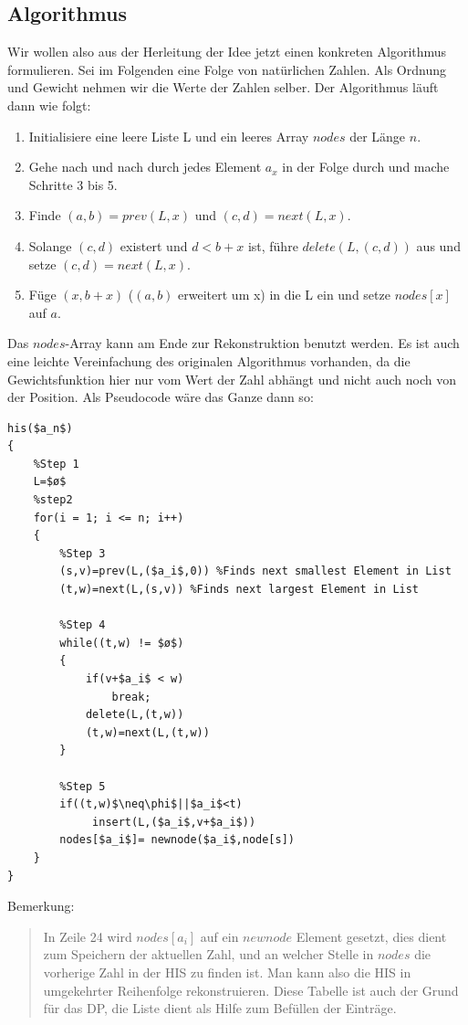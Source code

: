 \subsection{Algorithmus}
 
Wir wollen also aus der Herleitung der Idee jetzt einen konkreten Algorithmus formulieren. Sei im Folgenden \an eine Folge von natürlichen Zahlen. Als Ordnung und Gewicht nehmen wir die Werte der Zahlen selber. Der Algorithmus läuft dann wie folgt:
\begin{enumerate}
    \item Initialisiere eine leere Liste L und ein leeres Array $nodes$ der Länge $n$.
    \item Gehe nach und nach durch jedes Element $a_x$ in der Folge durch und mache Schritte 3 bis 5.
    \item Finde $(a,b)=prev(L,x)$ und $(c,d)=next(L,x)$.
    \item Solange $(c,d)$ existert und $d<b+x$ ist, führe $delete(L,(c,d))$ aus und setze $(c,d)=next(L,x)$.
    \item Füge $(x,b+x)$ ($(a,b)$ erweitert um x) in die L ein und setze $nodes[x]$ auf $a$.
\end{enumerate}

Das $nodes$-Array kann am Ende zur Rekonstruktion benutzt werden. Es ist auch eine leichte Vereinfachung des originalen Algorithmus vorhanden, da die Gewichtsfunktion hier nur vom Wert der Zahl abhängt und nicht auch noch von der Position. Als Pseudocode wäre das Ganze dann so: \newpage

\begin{lstlisting}[mathescape]
his($a_n$)
{
    %Step 1
    L=$ø$
    %step2
    for(i = 1; i <= n; i++)
    {
        %Step 3
        (s,v)=prev(L,($a_i$,0)) %Finds next smallest Element in List
        (t,w)=next(L,(s,v)) %Finds next largest Element in List

        %Step 4
        while((t,w) != $ø$)
        {
            if(v+$a_i$ < w)
                break;
            delete(L,(t,w))
            (t,w)=next(L,(t,w))
        }

        %Step 5
        if((t,w)$\neq\phi$||$a_i$<t)
       		 insert(L,($a_i$,v+$a_i$))
        nodes[$a_i$]= newnode($a_i$,node[s])
    }
}
\end{lstlisting}
\small Bemerkung:
\begin{quote}
    \footnotesize In Zeile 24 wird $nodes[a_i]$ auf ein $newnode$ Element gesetzt, dies dient zum Speichern der aktuellen Zahl, und an welcher Stelle in $nodes$ die vorherige Zahl in der HIS zu finden ist. Man kann also die HIS in umgekehrter Reihenfolge rekonstruieren. Diese Tabelle ist auch der Grund für das DP, die Liste dient als Hilfe zum Befüllen der Einträge.
\end{quote}
\normalsize


